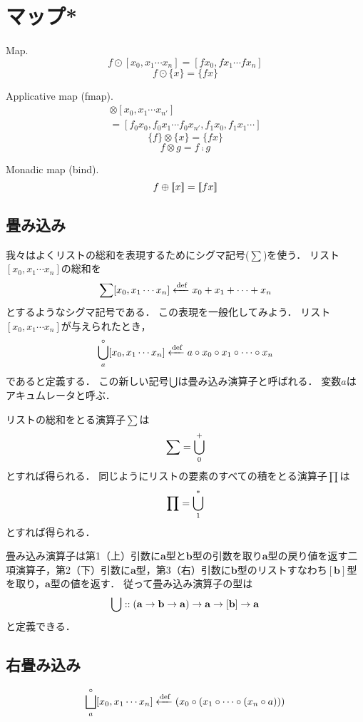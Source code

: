 \documentclass[twocolumn]{jsbook}
\newcommand{\typename}[1]{\mathbf{#1}}
\newcommand{\listtype}[1]{[#1]}
\begin{document}
\chapter{マップ*}

Map.
$$f\odot[x_0,x_1\dotsb x_n]=[fx_0,fx_1\dotsb fx_n]$$
$$f\odot\{x\}=\{fx\}$$

Applicative map (fmap).
\begin{multline*}
[f_0,f_1\dotsb f_n]\otimes[x_0,x_1\dotsb x_{n'}]\\
=[f_0x_0,f_0x_1\dotsb f_0x_{n'},f_1x_0,f_1x_1\dotsb]
\end{multline*}
$$\{f\}\otimes\{x\}=\{fx\}$$
$$f\otimes g=f\comp g$$

Monadic map (bind).
$$f\oplus\left[\!\left[x\right]\!\right]=\left[\!\left[fx\right]\!\right]$$


\section{畳み込み}

我々はよくリストの総和を表現するためにシグマ記号($\sum$)を使う．
リスト$\listtype{x_0,x_1\dotsb x_n}$の総和を$$\sum\listtype{x_0,x_1\dotsb x_n}\defeq x_0+x_1+\dotsb+x_n$$とするようなシグマ記号である．
この表現を一般化してみよう．
リスト$\listtype{x_0,x_1\dotsb x_n}$が与えられたとき，$$\foldfunc^\circ_a\listtype{x_0,x_1\dotsb x_n}\defeq a\circ x_0\circ x_1\circ\dotsb\circ x_n$$であると定義する．
この新しい記号$\bigcup$は畳み込み演算子と呼ばれる．
変数$a$はアキュムレータと呼ぶ．

リストの総和をとる演算子$\sum$は$$\sum=\bigcup^+_0$$とすれば得られる．
同じようにリストの要素のすべての積をとる演算子$\prod$は$$\prod=\bigcup^\ast_1$$とすれば得られる．

畳み込み演算子は第1（上）引数に$\typename{a}$型と$\typename{b}$型の引数を取り$\typename{a}$型の戻り値を返す二項演算子，第2（下）引数に$\typename{a}$型，第3（右）引数に$\typename{b}$型のリストすなわち$\listtype{\typename{b}}$型を取り，$\typename{a}$型の値を返す．
従って畳み込み演算子の型は$$\foldfunc::(\typename{a}\rightarrow\typename{b}\rightarrow\typename{a})\rightarrow\typename{a}\rightarrow\listtype{\typename{b}}\rightarrow\typename{a}$$と定義できる．

\section{右畳み込み}

$$\foldrightfunc_a^\circ\listtype{x_0,x_1\dotsb x_n}\defeq\left(x_0\circ\left(x_1\circ\dotsb\circ\left(x_n\circ a\right)\right)\right)$$
\end{document}
